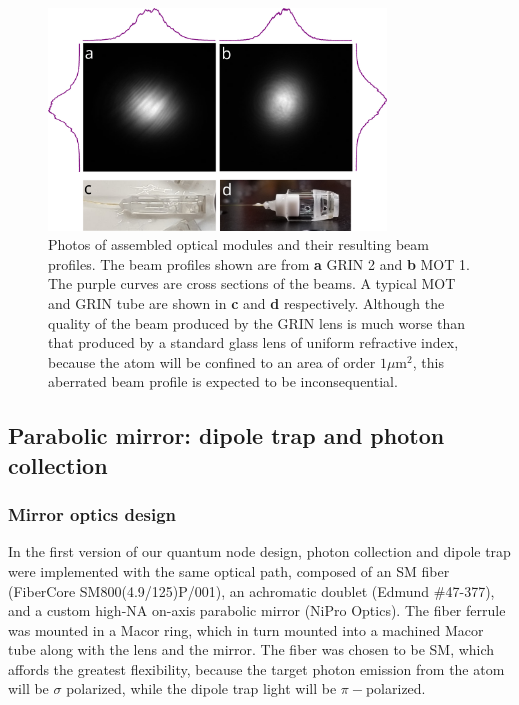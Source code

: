 \begin{figure}[ht]
    \centering
    \includegraphics[width=0.8\textwidth]{Images/MOT_and_GRIN_tubes.pdf}
    \caption{Photos of assembled optical modules and their resulting beam profiles. The beam profiles shown are from \textbf{a} GRIN 2 and \textbf{b} MOT 1. The purple curves are cross sections of the beams. A typical MOT and GRIN tube are shown in \textbf{c} and \textbf{d} respectively. Although the quality of the beam produced by the GRIN lens is much worse than that produced by a standard glass lens of uniform refractive index, because the atom will be confined to an area of order $1 \mu$m$^2$, this aberrated beam profile is expected to be inconsequential.}
    \label{fig:assembled_optical_tubes}
\end{figure}

\subsection{Parabolic mirror: dipole trap and photon collection}\label{sec:mirror}

\subsubsection{Mirror optics design}

In the first version of our quantum node design, photon collection and dipole trap were implemented with the same optical path, composed of an SM fiber (FiberCore SM800(4.9/125)P/001), an achromatic doublet (Edmund $\#$47-377), and a custom high-NA on-axis parabolic mirror (NiPro Optics). The fiber ferrule was mounted in a Macor ring, which in turn mounted into a machined Macor tube along with the lens and the mirror. The fiber was chosen to be SM, which affords the greatest flexibility, because the target photon emission from the atom will be $\sigma$ polarized, while the dipole trap light will be $\pi-$polarized. 

